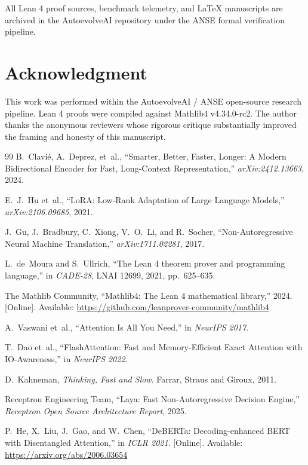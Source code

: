 \documentclass[10pt,journal,compsoc]{IEEEtran}
\theoremstyle{remark}
\begin{document}
All Lean 4 proof sources, benchmark telemetry, and LaTeX manuscripts are archived in the AutoevolveAI repository under the ANSE formal verification pipeline.

\section*{Acknowledgment}
This work was performed within the AutoevolveAI / ANSE open-source research pipeline. Lean 4 proofs were compiled against Mathlib4 v4.34.0-rc2. The author thanks the anonymous reviewers whose rigorous critique substantially improved the framing and honesty of this manuscript.

\begin{thebibliography}{99}
B.~Clavi\'{e}, A.~Deprez, et~al., ``Smarter, Better, Faster, Longer: A Modern Bidirectional Encoder for Fast, Long-Context Representation,'' \emph{arXiv:2412.13663}, 2024.

E.~J.~Hu et~al., ``LoRA: Low-Rank Adaptation of Large Language Models,'' \emph{arXiv:2106.09685}, 2021.

J.~Gu, J.~Bradbury, C.~Xiong, V.~O.~Li, and R.~Socher, ``Non-Autoregressive Neural Machine Translation,'' \emph{arXiv:1711.02281}, 2017.

L.~de~Moura and S.~Ullrich, ``The Lean 4 theorem prover and programming language,'' in \emph{CADE-28}, LNAI 12699, 2021, pp.~625--635.

The Mathlib Community, ``Mathlib4: The Lean 4 mathematical library,'' 2024. [Online]. Available: \url{https://github.com/leanprover-community/mathlib4}

A.~Vaswani et~al., ``Attention Is All You Need,'' in \emph{NeurIPS 2017}.

T.~Dao et~al., ``FlashAttention: Fast and Memory-Efficient Exact Attention with IO-Awareness,'' in \emph{NeurIPS 2022}.

D.~Kahneman, \emph{Thinking, Fast and Slow}. Farrar, Straus and Giroux, 2011.

Receptron Engineering Team, ``Laya: Fast Non-Autoregressive Decision Engine,'' \emph{Receptron Open Source Architecture Report}, 2025.

P.~He, X.~Liu, J.~Gao, and W.~Chen, ``DeBERTa: Decoding-enhanced BERT with Disentangled Attention,'' in \emph{ICLR 2021}. [Online]. Available: \url{https://arxiv.org/abs/2006.03654}
\end{thebibliography}
\end{document}
